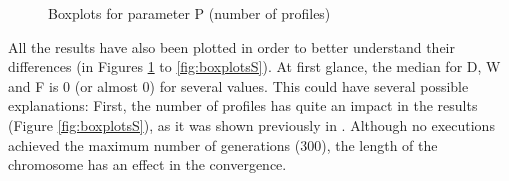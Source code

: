 \documentclass[runningheads,a4paper]{llncs}
\begin{document}
\begin{figure}
        \centering
        \caption{Boxplots for parameter P (number of profiles)}\label{fig:boxplotsP}
\end{figure}
%
All the results have also been plotted in order to better understand 
their differences (in Figures \ref{fig:boxplotsP} to \ref{fig:boxplotsS}). At first glance, the median for D, W and F is 0 (or almost 0) for several
values. This could have several possible explanations: First, the
number of profiles has quite an impact in the results (Figure
\ref{fig:boxplotsS}), as it was shown previously in
\cite{garcia14my}. Although no executions achieved the maximum number
of generations (300), %
 the length of the chromosome has an effect in the
 convergence. %
\end{document}

